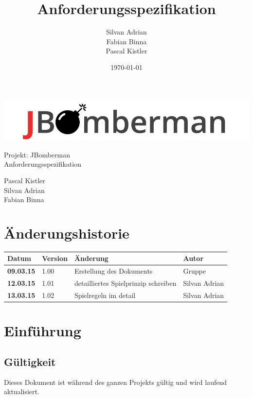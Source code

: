 \documentclass[11pt]{scrartcl}
\title{Anforderungsspezifikation}
\author{Silvan Adrian \\ Fabian Binna \\ Pascal Kistler}
\date{\today{}}
\begin{document}
\def\arraystretch{1.5}
\begin{titlepage}
\begin{center}
\vspace{10em}
\includegraphics[scale=2]{jbomberman}
\vspace{10em}
\end{center}
\begin{center}
\huge {Projekt: JBomberman} \\
\huge {Anforderungsspezifikation}
\end{center}
\begin{center}
\vspace{10em}
\LARGE {Pascal Kistler} \\
\LARGE {Silvan Adrian} \\
\LARGE {Fabian Binna}
\end{center}

\end{titlepage}

\newpage
\section{Änderungshistorie}
\label{sec:Änderungen}

\begin{tabularx}{\linewidth}{l l l l}
\textbf{Datum} & \textbf{Version} & \textbf{Änderung}  & \textbf{Autor} \\
\hline
\textbf{09.03.15} & 1.00 & Erstellung des Dokuments & Gruppe \\
\textbf{12.03.15} & 1.01 & detailliertes Spielprinzip schreiben & Silvan Adrian \\
\textbf{13.03.15} & 1.02 & Spielregeln im detail & Silvan Adrian \\
\end{tabularx}

\newpage
\tableofcontents
\newpage
\section{Einführung}
\label{sec:Einführung}

\subsection{Gültigkeit}
\label{sec:Gültigkeit}
Dieses Dokument ist während des ganzen Projekts gültig und wird laufend aktualisiert.
\end{document}
